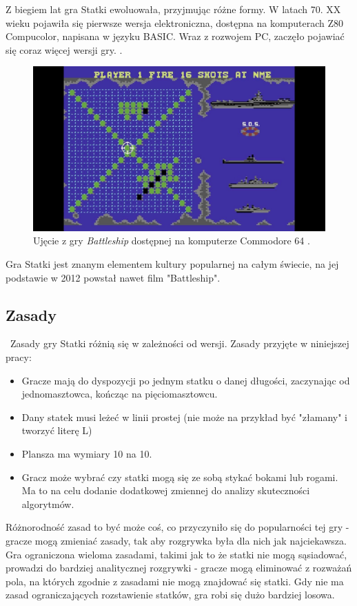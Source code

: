  \indent Z biegiem lat gra Statki ewoluowała, przyjmując różne formy. W latach 70. XX wieku pojawiła się pierwsze wersja elektroniczna, dostępna na komputerach Z80 Compucolor, napisana w języku BASIC. Wraz z rozwojem PC, zaczęło pojawiać się coraz więcej wersji gry.\cite{historyWiki} \cite{museumOfGames} .

 \begin{figure}[!h]
    \label{fig:commodore_64}
    \centering \includegraphics[width=0.8\linewidth]{img/commodore_64.jpg}
    \caption{Ujęcie z gry \emph{Battleship} dostępnej na komputerze Commodore 64 \cite{commodore64}.}
\end{figure}

\indent Gra Statki jest znanym elementem kultury popularnej na całym świecie, na jej podstawie w 2012 powstał nawet film "Battleship".
\subsection{Zasady}
\indent\ Zasady gry Statki różnią się w zależności od wersji. Zasady przyjęte w niniejszej pracy:
\begin{itemize}
  \item Gracze mają do dyspozycji po jednym statku o danej długości, zaczynając od jednomasztowca, kończąc na pięciomasztowcu.
  \item Dany statek musi leżeć w linii prostej (nie może na przykład być "złamany" i tworzyć literę L)
  \item Plansza ma wymiary 10 na 10.
  \item Gracz może wybrać czy statki mogą się ze sobą stykać bokami lub rogami. Ma to na celu dodanie dodatkowej zmiennej do analizy skuteczności algorytmów.
\end{itemize}

Różnorodność zasad to być może coś, co przyczyniło się do popularności tej gry - gracze mogą zmieniać zasady, tak aby rozgrywka była dla nich jak najciekawsza. Gra ograniczona wieloma zasadami, takimi jak to że statki nie mogą sąsiadować, prowadzi do bardziej analitycznej rozgrywki - gracze mogą eliminować z rozważań pola, na których zgodnie z zasadami nie mogą znajdować się statki. Gdy nie ma zasad ograniczających rozstawienie statków, gra robi się dużo bardziej losowa.